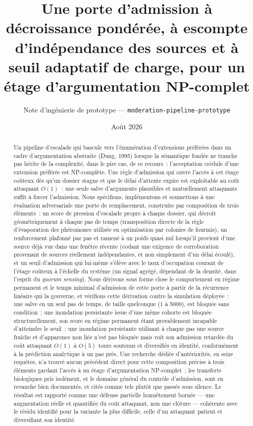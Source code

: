\documentclass[11pt]{article}
\title{Une porte d'admission à décroissance pondérée, à escompte
  d'indépendance des sources et à seuil adaptatif de charge, pour un
  étage d'argumentation NP-complet}
\author{Note d'ingénierie de prototype --- \texttt{moderation-pipeline-prototype}}
\date{Août 2026}
\begin{document}
\maketitle

\begin{abstract}
Un pipeline d'escalade qui bascule vers l'énumération d'extensions préférées
dans un cadre d'argumentation abstraite (Dung, 1995) lorsque la sémantique
fondée ne tranche pas hérite de la complexité, dans le pire cas, de ce
recours~: l'acceptation crédule d'une extension préférée est NP-complète.
Une règle d'admission qui ouvre l'accès à cet étage coûteux dès qu'un
dossier stagne et que le délai d'attente expire est exploitable au coût
attaquant $O(1)$~: une seule salve d'arguments plausibles et mutuellement
attaquants suffit à forcer l'admission. Nous spécifions, implémentons et
soumettons à une évaluation adversariale une porte de remplacement,
construite par composition de trois éléments~: un score de pression
d'escalade propre à chaque dossier, qui décroît géométriquement à chaque
pas de temps (transposition directe de la règle d'évaporation des
phéromones utilisée en optimisation par colonies de fourmis), un
renforcement plafonné par pas et ramené à un poids quasi nul lorsqu'il
provient d'une source déjà vue dans une fenêtre récente (codant une
exigence de corroboration provenant de sources réellement indépendantes,
et non simplement d'un délai écoulé), et un seuil d'admission qui
lui-même s'élève avec le taux d'occupation courant de l'étage coûteux à
l'échelle du système (un signal agrégé, dépendant de la densité, dans
l'esprit du \emph{quorum sensing}). Nous dérivons sous forme close le
comportement en régime permanent et le temps minimal d'admission de cette
porte à partir de la récurrence linéaire qui la gouverne, et vérifions
cette dérivation contre la simulation déployée~: une salve en un seul pas
de temps, de taille quelconque (1 à 5000), est bloquée sans condition~;
une inondation persistante issue d'une même cohorte est bloquée
structurellement, son score en régime permanent étant provablement
incapable d'atteindre le seuil~; une inondation persistante utilisant à
chaque pas une source fraîche et d'apparence non liée n'est pas bloquée
mais voit son admission retardée du coût attaquant $O(1)$ à $O(5)$ tours
soutenus et diversifiés en identité, conformément à la prédiction
analytique à un pas près. Une recherche dédiée d'antériorités, en seize
requêtes, n'a trouvé aucun précédent direct pour cette composition
précise à trois éléments gardant l'accès à un étage d'argumentation
NP-complet~; les transferts biologiques pris isolément, et le domaine
général du contrôle d'admission, sont en revanche bien documentés, et
cités comme tels plutôt que passés sous silence. Le résultat est
rapporté comme une défense partielle honnêtement bornée --- une
augmentation réelle et quantifiée du coût attaquant, non une clôture ---
cohérente avec le résidu identifié pour la variante la plus difficile, celle
d'un attaquant patient et diversifiant son identité.
\end{abstract}
\end{document}
